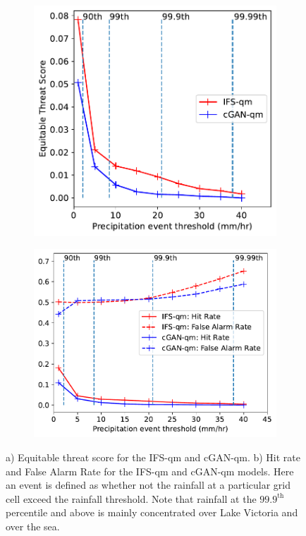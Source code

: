 \documentclass{article}
\begin{document}
\begin{figure}[ht]
    \centering
     \begin{subfigure}[t]{0.45\textwidth}

     \includegraphics[width=\textwidth]{images/ets_final-nologs_217600.pdf}
     \caption{}
     \end{subfigure}
     \hfill
     \centering
     \begin{subfigure}[t]{0.49\textwidth}
     \includegraphics[width=\textwidth]{images/hit_rate_final-nologs_217600.pdf}
     \caption{}
     \end{subfigure}
     \caption{ a) Equitable threat score for the IFS-qm and cGAN-qm. b) Hit rate and False Alarm Rate for the IFS-qm and cGAN-qm models. Here an event is defined as whether not the rainfall at a particular grid cell exceed the rainfall threshold. Note that rainfall at the $99.9^{\text{th}}$ percentile and above is mainly concentrated over Lake Victoria and over the sea.}
     \label{fig:ets}
\end{figure}
\end{document}
